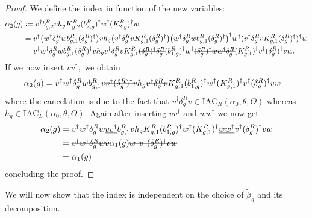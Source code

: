 \documentclass[12pt,a4paper,twoside]{article}
\numberwithin{equation}{section}
\begin{document}
\begin{proof}
	We define the index in function of the new variables:
	\begin{align}
		\alpha_2(g)&\defeq v^\dagger b^R_{g,2}v h_g K^R_{g,2}(b^R_{2,g})^\dagger w^\dagger (K^R_{2,g})^\dagger w\\
		&=v^\dagger \left(w^\dagger\delta^R_g w b_{g,1}^R (\delta^R_g)^\dagger\right) v h_g \left(v^\dagger \delta_g^R v K_{g,1}^R (\delta_g^R)^\dagger\right) \left(w^\dagger\delta^R_g w b_{g,1}^R (\delta^R_g)^\dagger\right)^\dagger w^\dagger (v^\dagger \delta_g^R v K_{g,1}^R (\delta_g^R)^\dagger)^\dagger w\\
		&=v^\dagger w^\dagger\delta^R_g w b_{g,1}^R (\delta^R_g)^\dagger v h_g v^\dagger \delta_g^R v K_{g,1}^R \stkout{(\delta_g^R)^\dagger \delta_g^R} (b_{1,g}^R)^\dagger w^\dagger \stkout{(\delta_g^R)^\dagger w w^\dagger \delta_g^R} (K_{g,1}^R)^\dagger v^\dagger (\delta_g^R)^\dagger v  w.
	\end{align}
	If we now insert $vv^\dagger,$ we obtain
	\begin{align}
		\alpha_2(g)&=v^\dagger w^\dagger\delta^R_g w b_{g,1}^R v\stkout{v^\dagger (\delta^R_g)^\dagger v} h_g \stkout{v^\dagger \delta_g^R v} K_{g,1}^R (b_{1,g}^R)^\dagger w^\dagger (K_{g,1}^R)^\dagger v^\dagger (\delta_g^R)^\dagger v  w
	\end{align}
	where the cancelation is due to the fact that $v^\dagger \delta^R_g v\in\textrm{IAC}_{R}(\alpha_0,\theta,\Theta)$ whereas $h_g\in \textrm{IAC}_{L}(\alpha_0,\theta,\Theta)$. Again after inserting $vv^\dagger$ and $ww^\dagger$ we now get
	\begin{align}
		\alpha_2(g)&=v^\dagger w^\dagger\delta^R_g w \underline{v v^\dagger} b_{g,1}^R v h_g K_{g,1}^R (b_{1,g}^R)^\dagger w^\dagger (K_{g,1}^R)^\dagger \underline{ww^\dagger} v^\dagger (\delta_g^R)^\dagger v  w\\
		&=\stkout{v^\dagger w^\dagger\delta^R_g w v} \alpha_1(g) \stkout{w^\dagger v^\dagger (\delta_g^R)^\dagger v  w}\\
		&=\alpha_1(g)
	\end{align}
	concluding the proof.
\end{proof}
We will now show that the index is independent on the choice of $\tilde{\beta}_g$ and its decomposition.
\end{document}
